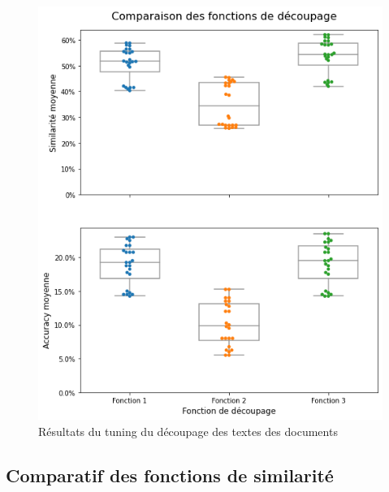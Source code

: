             \begin{figure}[htbp]
                \begin{center}
                \includegraphics[width=0.9\linewidth]{img/tuning_split.png}
                \end{center}
                \caption{Résultats du tuning du découpage des textes des documents}
                \label{fig:tuning_split}
            \end{figure}

            \subsection{Comparatif des fonctions de similarité}

